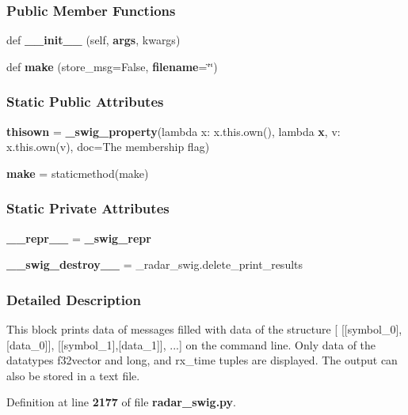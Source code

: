 \subsubsection*{Public Member Functions}
\begin{DoxyCompactItemize}
\item 
def {\bf \+\_\+\+\_\+init\+\_\+\+\_\+} (self, {\bf args}, kwargs)
\item 
def {\bf make} (store\+\_\+msg=False, {\bf filename}=\char`\"{}\char`\"{})
\end{DoxyCompactItemize}
\subsubsection*{Static Public Attributes}
\begin{DoxyCompactItemize}
\item 
{\bf thisown} = {\bf \+\_\+swig\+\_\+property}(lambda x\+: x.\+this.\+own(), lambda {\bf x}, v\+: x.\+this.\+own(v), doc=\textquotesingle{}The membership flag\textquotesingle{})
\item 
{\bf make} = staticmethod(make)
\end{DoxyCompactItemize}
\subsubsection*{Static Private Attributes}
\begin{DoxyCompactItemize}
\item 
{\bf \+\_\+\+\_\+repr\+\_\+\+\_\+} = {\bf \+\_\+swig\+\_\+repr}
\item 
{\bf \+\_\+\+\_\+swig\+\_\+destroy\+\_\+\+\_\+} = \+\_\+radar\+\_\+swig.\+delete\+\_\+print\+\_\+results
\end{DoxyCompactItemize}


\subsubsection{Detailed Description}
\begin{DoxyVerb}This block prints data of messages filled with data of the structure [ [[symbol_0],[data_0]], [[symbol_1],[data_1]], ...] on the command line. Only data of the datatypes f32vector and long, and rx_time tuples are displayed. The output can also be stored in a text file.\end{DoxyVerb}
 

Definition at line {\bf 2177} of file {\bf radar\+\_\+swig.\+py}.



